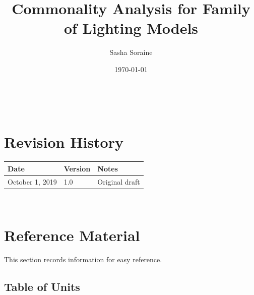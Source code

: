 \documentclass[12pt]{article}
\newcommand{\famname}{Family of Lighting Models} %
\begin{document}
\title{Commonality Analysis for \famname} %
\author{Sasha Soraine}
\date{\today}

\maketitle

~\newpage


%
%
%

\section{Revision History}

\begin{tabularx}{\textwidth}{p{3cm}p{2cm}X}
\toprule {\bf Date} & {\bf Version} & {\bf Notes}\\
\midrule
October 1, 2019 & 1.0 & Original draft\\
\bottomrule
\end{tabularx}

~\newpage
	
\section{Reference Material}

This section records information for easy reference.

\subsection{Table of Units}
\end{document}
